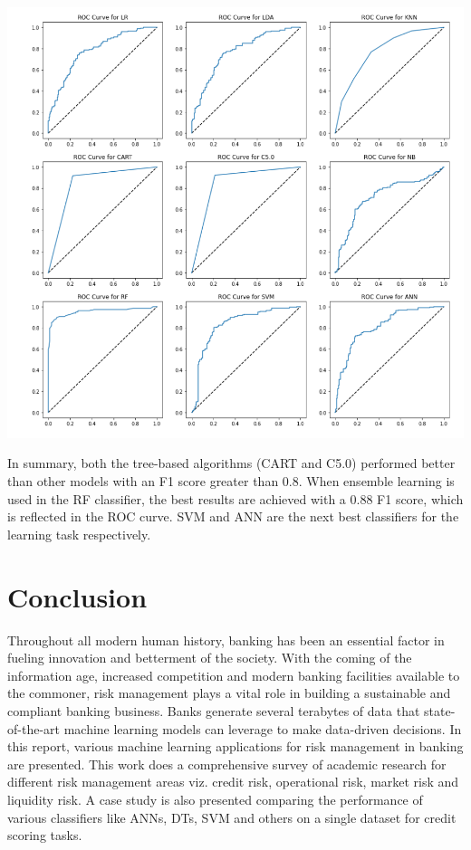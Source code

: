 \documentclass[a4paper, 12pt]{article}
\begin{document}
\begin{center}
\includegraphics[scale=0.7]{roc.png}
\label{fig:roc}
\end{center}

\noindent In summary, both the tree-based algorithms (CART and C5.0) performed better than other models with an F1 score greater than 0.8. When ensemble learning is used in the RF classifier, the best results are achieved with a 0.88 F1 score, which is reflected in the ROC curve. SVM and ANN are the next best classifiers for the learning task respectively.

\newpage
\section{\centering Conclusion}
\vskip 0.25in
Throughout all modern human history, banking has been an essential factor in fueling innovation and betterment of the society. With the coming of the information age, increased competition and modern banking facilities available to the commoner, risk management plays a vital role in building a sustainable and compliant banking business. Banks generate several terabytes of data that state-of-the-art machine learning models can leverage to make data-driven decisions. In this report, various machine learning applications for risk management in banking are presented. This work does a comprehensive survey of academic research for different risk management areas viz. credit risk, operational risk, market risk and liquidity risk. A case study is also presented comparing the performance of various classifiers like ANNs, DTs, SVM and others on a single dataset for credit scoring tasks.
\end{document}
